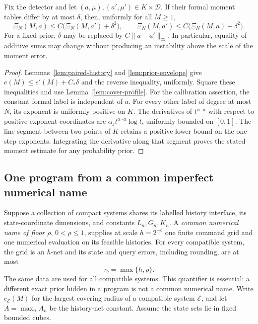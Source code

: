 \begin{corollary}
\label{cor:profile-stability}
Fix the detector and let $(a,\mu),(a',\mu')\in K\times\mathcal D$.
If their formal moment tables differ by at most $\delta$, then,
uniformly for all $M\ge1$,
\begin{equation}\label{eq:xi-stability}
 \Xi_N(M,a)\le C\bigl(\Xi_N(M,a')+\delta^2\bigr),\qquad
 \Xi_N(M,a')\le C\bigl(\Xi_N(M,a)+\delta^2\bigr).
\end{equation}
For a fixed prior, $\delta$ may be replaced by $C\|a-a'\|_\infty$.
In particular, equality of additive sums may change without producing
an instability above the scale of the moment error.
\end{corollary}
\begin{proof}
Lemmas~\ref{lem:paired-history} and \ref{lem:prior-envelope} give
$e(M)\le e'(M)+C_*\delta$ and the reverse inequality, uniformly.
Square these inequalities and use Lemma~\ref{lem:cover-profile}.
For the calibration assertion, the constant formal label is independent
of $a$. For every other label of degree at most $N$, its exponent is
uniformly positive on $K$. The derivatives of $t^{\alpha\cdot a}$
with respect to positive-exponent coordinates are
$\alpha_jt^{\alpha\cdot a}\log t$, uniformly bounded on $[0,1]$.
The line segment between two points of $K$ retains a positive lower
bound on the one-step exponents. Integrating the derivative along that
segment proves the stated moment estimate for any probability prior.
\end{proof}

\subsection{One program from a common imperfect numerical name}
Suppose a collection of compact systems shares its labelled history
interface, its state-coordinate dimensions, and constants $L_n,G_n,K_n$.
A \emph{common numerical name of floor $\rho$}, $0<\rho\le1$, supplies
at scale $h=2^{-b}$ one finite command grid and one numerical evaluation
on its feasible histories. For every compatible system, the grid is an
$h$-net and its state and query errors, including rounding, are at most
\[
 \tau_b=\max\{h,\rho\}.
\]
The same data are used for all compatible systems. This quantifier is
essential: a different exact prior hidden in a program is not a common
numerical name. Write $e_{\mathcal E}(M)$ for the largest covering radius
of a compatible system $\mathcal E$, and let $A=\max_n A_n$ be the
history-net constant. Assume the state sets lie in fixed bounded cubes.

